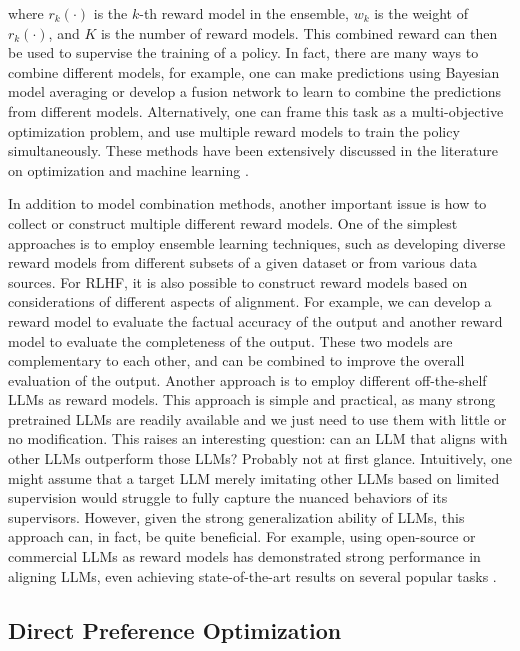 \noindent where $r_k(\cdot)$ is the $k$-th reward model in the ensemble, $w_k$ is the weight of $r_k(\cdot)$, and $K$ is the number of reward models. This combined reward can then be used to supervise the training of a policy. In fact, there are many ways to combine different models, for example, one can make predictions using Bayesian model averaging
or develop a fusion network to learn to combine the predictions from different models. Alternatively, one can frame this task as a multi-objective optimization problem, and use multiple reward models to train the policy simultaneously. These methods have been extensively discussed in the literature on optimization and machine learning \cite{miettinen:1999nonlinear,Bishop:2006}.

In addition to model combination methods, another important issue is how to collect or construct multiple different reward models. One of the simplest approaches is to employ ensemble learning techniques, such as developing diverse reward models from different subsets of a given dataset or from various data sources. For RLHF, it is also possible to construct reward models based on considerations of different aspects of alignment. For example, we can develop a reward model to evaluate the factual accuracy of the output and another reward model to evaluate the completeness of the output. These two models are complementary to each other, and can be combined to improve the overall evaluation of the output. Another approach is to employ different off-the-shelf LLMs as reward models. This approach is simple and practical, as many strong pretrained LLMs are readily available and we just need to use them with little or no modification. This raises an interesting question: can an LLM that aligns with other LLMs outperform those LLMs? Probably not at first glance. Intuitively, one might assume that a target LLM merely imitating other LLMs based on limited supervision would struggle to fully capture the nuanced behaviors of its supervisors. However, given the strong generalization ability of LLMs, this approach can, in fact, be quite beneficial. For example, using open-source or commercial LLMs as reward models has demonstrated strong performance in aligning LLMs, even achieving state-of-the-art results on several popular tasks \cite{lambert-etal:2024rewardbench}.

\subsection{Direct Preference Optimization}

